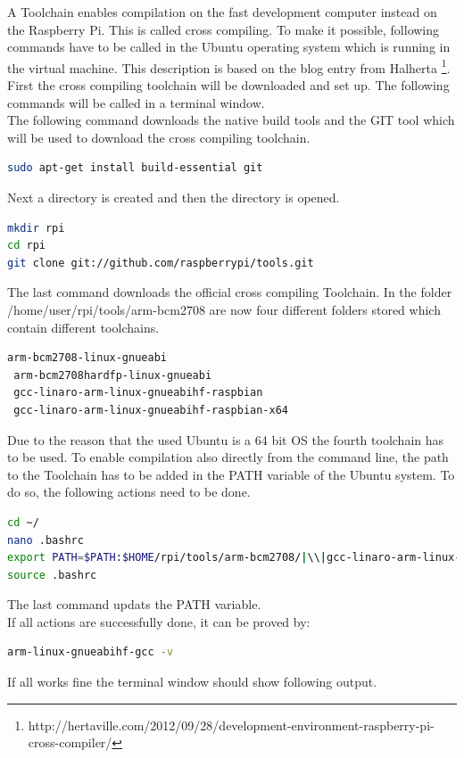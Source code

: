 A Toolchain enables compilation on the fast development computer instead on the Raspberry Pi. This is called cross compiling. To make it possible, following commands have to be called in the Ubuntu operating system which is running in the virtual machine. This description is based on the blog entry from Halherta \footnote{http://hertaville.com/2012/09/28/development-environment-raspberry-pi-cross-compiler/}.\\
First the cross compiling toolchain will be downloaded and set up. The following commands will be called in a terminal window.\\
The following command downloads the native build tools and the GIT tool which will be used to download the cross compiling toolchain.
\begin{lstlisting}[language=bash,otherkeywords={sudo,tar,touch,gedit,cp,apt-get,mkdir}]
sudo apt-get install build-essential git
\end{lstlisting}
Next a directory is created and then the directory is opened.
\begin{lstlisting}[language=bash,otherkeywords={sudo,tar,touch,gedit,cp,apt-get,mkdir}]
mkdir rpi
cd rpi
git clone git://github.com/raspberrypi/tools.git
\end{lstlisting}
The last command downloads the official cross compiling Toolchain. 
In the folder \newline/home/user/rpi/tools/arm-bcm2708 are now four different folders stored which contain different toolchains.
\begin{lstlisting}[language=bash]
 arm-bcm2708-linux-gnueabi
 arm-bcm2708hardfp-linux-gnueabi
 gcc-linaro-arm-linux-gnueabihf-raspbian
 gcc-linaro-arm-linux-gnueabihf-raspbian-x64
\end{lstlisting}
Due to the reason that the used Ubuntu is a 64 bit OS the fourth toolchain has to be used.
To enable compilation also directly from the command line, the path to the Toolchain has to be added in the PATH variable of the Ubuntu system. To do so, the following actions need to be done.

\begin{lstlisting}[language=bash,otherkeywords={sudo,tar,touch,gedit,cp,apt-get,mkdir},escapechar=|]
cd ~/
nano .bashrc
export PATH=$PATH:$HOME/rpi/tools/arm-bcm2708/|\\|gcc-linaro-arm-linux-gnueabihf-raspbian-x64/bin
source .bashrc
\end{lstlisting}
The last command updats the PATH variable.\\
If all actions are successfully done, it can be proved by:
\begin{lstlisting}[language=bash]
arm-linux-gnueabihf-gcc -v
\end{lstlisting}
If all works fine the terminal window should show following output.

